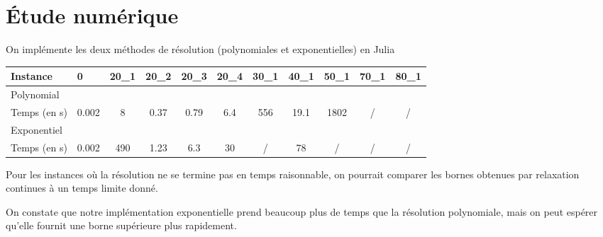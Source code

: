 \documentclass{article}
\begin{document}
\section{Étude numérique}

On implémente les deux méthodes de résolution (polynomiales et exponentielles) en Julia

\begin{table}[!ht]
\begin{tabular}{|l|c|c|c|c|c|c|c|c|c|c|}
\hline
Instance     & \multicolumn{1}{l|}{0} & \multicolumn{1}{l|}{20_1} & \multicolumn{1}{l|}{20_2} & \multicolumn{1}{l|}{20_3} & \multicolumn{1}{l|}{20_4} & \multicolumn{1}{l|}{30_1} & \multicolumn{1}{l|}{40_1} & \multicolumn{1}{l|}{50_1} & \multicolumn{1}{l|}{70_1} & \multicolumn{1}{l|}{80_1} \\ \hline
\multicolumn{11}{|l|}{Polynomial}                                                                                                                                                                                                                                                                 \\ \hline
Temps (en s) & 0.002                  & 8                         & 0.37                      & 0.79                      & 6.4                       & 556                       & 19.1                      & 1802                      & /                         & /                         \\ \hline
\multicolumn{11}{|l|}{Exponentiel}                                                                                                                                                                                                                                                                \\ \hline
Temps (en s) & 0.002                  & 490                       & 1.23                      & 6.3                       & 30                        & /                         & 78                        & /                         & /                         & /                         \\ \hline
\end{tabular}
\end{table}

Pour les instances où la résolution ne se termine pas en temps raisonnable, on pourrait comparer
les bornes obtenues par relaxation continues à un temps limite donné.

On constate que notre implémentation exponentielle prend beaucoup plus de temps que la résolution polynomiale, mais on peut espérer qu'elle fournit une borne supérieure plus rapidement.
\end{document}
